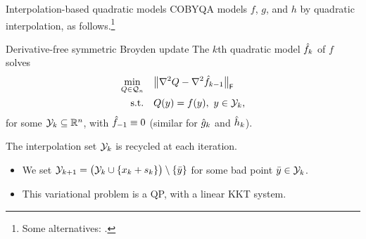 \documentclass[
]{talk}
\newcommand*{\ceq}{h}
\newcommand*{\ceqm}[1][]{\hat{\ceq}\ifblank{#1}{}{_{#1}}}
\newcommand*{\cub}{g}
\newcommand*{\cubm}[1][]{\hat{\cub}\ifblank{#1}{}{_{#1}}}
\newcommand*{\iter}[1][]{x\ifblank{#1}{}{_{#1}}}
\newcommand*{\obj}{f}
\newcommand*{\objm}[1][]{\hat{\obj}\ifblank{#1}{}{_{#1}}}
\newcommand*{\step}[1][]{s\ifblank{#1}{}{_{#1}}}
\newcommand*{\xpt}[1][]{\mathcal{Y}\ifblank{#1}{}{_{#1}}}
\begin{document}
\begin{frame}{Interpolation-based quadratic models}
    COBYQA models $\obj$, $\cub$, and $\ceq$ by \alert{quadratic} interpolation, as follows.\footnote{Some alternatives: \textcite{Conn_Scheinberg_Toint_1997a,Conn_Scheinberg_Toint_1997b,Conn_Scheinberg_Toint_1998,Wild_2008,Bandeira_Scheinberg_Vicente_2012,Zhang_2014,Xie_Yuan_2023}.}

    \begin{exampleblock}{Derivative-free symmetric Broyden update \parencite{Powell_2004}}
        The $k$th quadratic model $\objm[k]$ of $\obj$ solves
        \begin{equation*}
            \begin{aligned}
                \min_{Q \in \mathcal{Q}_n}  & \quad \norm[\big]{\nabla^2 Q - \nabla^2 \objm[k - 1]}_{\mathsf{F}}\\
                \textrm{s.t.}               & \quad Q(y) = \obj(y), ~ y \in \xpt[k]\text{,}
            \end{aligned}
        \end{equation*}
        for some $\xpt[k] \subseteq \R^n$, with $\objm[-1] \equiv 0$ (similar for $\cubm[k]$ and $\ceqm[k]$).
    \end{exampleblock}

    The interpolation set $\xpt[k]$ is \alert{recycled} at each iteration.
    \begin{itemize}
        \item We set $\xpt[k + 1] = \big(\xpt[k] \cup \set{\iter[k] + \step[k]}\big) \setminus \set{\bar{y}}$ for some bad point $\bar{y} \in \xpt[k]$.
        \item This variational problem is a QP, with a \alert{linear} KKT system.
    \end{itemize}
\end{frame}
\end{document}
